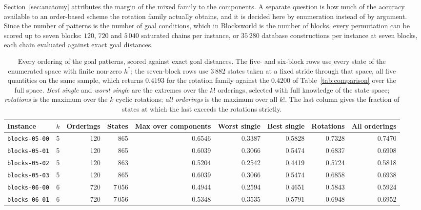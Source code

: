 \documentclass[10pt,twocolumn,a4paper]{article}
\theoremstyle{plain}
\theoremstyle{definition}
\theoremstyle{remark}
\newcommand{\hstar}{h^{*}}
\newcommand{\code}[1]{\texttt{#1}}
\begin{document}
Section~\ref{sec:anatomy} attributes the margin of the mixed family to the
components. A separate question is how much of the accuracy available to an
order-based scheme the rotation family actually obtains, and it is decided
here by enumeration instead of by argument. Since the number of patterns is
the number of goal conditions, which in Blocksworld is the number of blocks,
every permutation can be scored up to seven blocks: $120$, $720$ and $5\,040$
saturated chains per instance, or $35\,280$ database constructions per instance
at seven blocks, each chain evaluated against exact goal distances.

\begin{table}[t]
\centering
\caption{Every ordering of the goal patterns, scored against exact goal
distances. The five- and six-block rows use every state of the enumerated space
with finite non-zero $\hstar$; the seven-block rows use $3\,882$ states taken
at a fixed stride through that space, all five quantities on the same sample,
which returns $0.4193$ for the rotation family against the $0.4200$ of
Table~\ref{tab:comparison} over the full space. \emph{Best single} and
\emph{worst single} are the extremes over the $k!$ orderings, selected with
full knowledge of the state space; \emph{rotations} is the maximum over the
$k$ cyclic rotations; \emph{all orderings} is the maximum over all $k!$. The
last column gives the fraction of states at which the last exceeds the
rotations strictly.}
\label{tab:orders}
\small
\begin{adjustbox}{max width=\textwidth}
\begin{tabular}{lrrrrrrrr}
\toprule
Instance & $k$ & Orderings & States & Max over components & Worst single &
Best single & Rotations & All orderings \\
\midrule
\code{blocks-05-00} & 5 & 120 & 865    & 0.6546 & 0.3387 & 0.5828 & 0.7328 & 0.7470 \\
\code{blocks-05-01} & 5 & 120 & 865    & 0.6039 & 0.3066 & 0.5474 & 0.6837 & 0.6908 \\
\code{blocks-05-02} & 5 & 120 & 863    & 0.5204 & 0.2542 & 0.4419 & 0.5724 & 0.5818 \\
\code{blocks-05-03} & 5 & 120 & 865    & 0.6039 & 0.3066 & 0.5474 & 0.6858 & 0.6938 \\
\midrule
\code{blocks-06-00} & 6 & 720 & 7\,056 & 0.4944 & 0.2594 & 0.4651 & 0.5843 & 0.5924 \\
\code{blocks-06-01} & 6 & 720 & 7\,056 & 0.5348 & 0.3535 & 0.5791 & 0.6948 & 0.6952 \\

\end{tabular}
\end{adjustbox}
\end{table}
\end{document}
